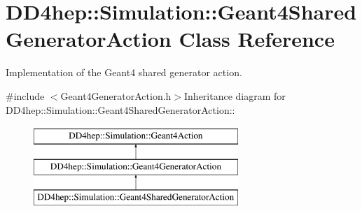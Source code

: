 \hypertarget{class_d_d4hep_1_1_simulation_1_1_geant4_shared_generator_action}{
\section{DD4hep::Simulation::Geant4SharedGeneratorAction Class Reference}
\label{class_d_d4hep_1_1_simulation_1_1_geant4_shared_generator_action}
}


Implementation of the Geant4 shared generator action.  


{\ttfamily \#include $<$Geant4GeneratorAction.h$>$}Inheritance diagram for DD4hep::Simulation::Geant4SharedGeneratorAction::\begin{figure}[H]
\begin{center}
\leavevmode
\includegraphics[height=3cm]{class_d_d4hep_1_1_simulation_1_1_geant4_shared_generator_action}
\end{center}
\end{figure}
